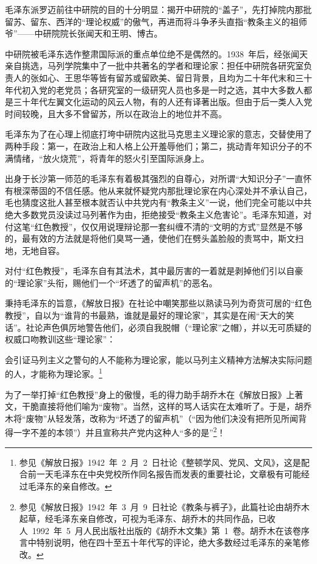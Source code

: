 毛泽东派罗迈前往中研院的目的十分明显：揭开中研院的“盖子”，先打掉院内那批留苏、留东、西洋的“理论权威”的傲气，再进而将斗争矛头直指“教条主义的祖师爷”——中研院院长张闻天和王明、博古。

中研院被毛泽东选作整肃国际派的重点单位绝不是偶然的。1938~年后，经张闻天亲自挑选，马列学院集中了一批中共著名的学者和理论家：担任中研院各研究室负责人的张如心、王思华等皆有留苏或留欧美、留日背景，且均为二十年代末和三十年代初入党的老党员；各研究室的一级研究人员也多是一时之选，其中大多数人都是三十年代左翼文化运动的风云人物，有的人还有译著出版。但由于后一类人入党时间较晚，且大多不曾留苏，所以在政治上的地位并不高。

毛泽东为了在心理上彻底打垮中研院内这批马克思主义理论家的意志，交替使用了两种手段：第一，在政治上和人格上公开羞辱他们；第二，挑动青年知识分子的不满情绪，“放火烧荒”，将青年的怒火引至国际派身上。

出身于长沙第一师范的毛泽东有着极其强烈的自尊心，对所谓“大知识分子”一直怀有根深蒂固的不信任感。他从来就怀疑党内那批理论家在内心深处并不承认自己，毛也猜度这批人甚至根本就否认中共党内有“教条主义”一说，他们完全可能以中共绝大多数党员没读过马列著作为由，拒绝接受“教条主义危害论”。毛泽东知道，对付这笔“红色教授”，仅仅用说理辩论那一套纠缠不清的“文明的方式”显然是不够的，最有效的方法就是将他们臭骂一通，使他们在劈头盖脸般的责骂中，斯文扫地，无地自容。

对付“红色教授”，毛泽东自有其法术，其中最厉害的一着就是剥掉他们引以自豪的“理论家”头衔，赐他们一个“坏透了的留声机”的恶名。

秉持毛泽东的旨意，《解放日报》在社论中嘲笑那些以熟读马列为奇货可居的“红色教授”，自以为“谁背的书最熟，谁就是最好的理论家”，其实是在闹“天大的笑话”。社论声色俱厉地警告他们，必须自我脱帽（“理论家”之帽），并以无可质疑的权威口吻教训这些“理论家”：

\begin{quoting}
会引证马列主义之警句的人不能称为理论家，能以马列主义精神方法解决实际问题的人，才能称为理论家。\footnote{参见《解放日报》1942~年~2~月~2~日社论《整顿学风、党风、文风》，这是配合前一天毛泽东在中央党校所作同名报告而发表的重要社论，文章极有可能经过毛泽东的亲自修改。}
\end{quoting}
为了一举打掉“红色教授”身上的傲慢，毛的得力助手胡乔木在《解放日报》上著文，干脆直接将他们喻为“废物”。当然，这样的骂人话实在太难听了。于是，胡乔木将“废物”从轻发落，改称为“坏透了的留声机”（“因为他们决没有把所见所闻背得一字不差的本领”）并且宣称共产党内这种人“多的是”\footnote{参见《解放日报》1942~年~3~月~9~日社论《教条与裤子》，此篇社论由胡乔木起草，经毛泽东亲自修改，可视为毛泽东、胡乔木的共同作品，已收人~1992~年~5~月人民出版社出版的《胡乔木文集》第~1~卷。胡乔木在该卷序言中特别说明，他在四十至五十年代写的评论，绝大多数经过毛泽东的亲笔修改。}！

